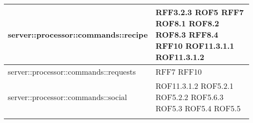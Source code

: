 \begin{center}
\begin{longtable}{| p{9cm} | p{4cm} |}
\hline
server::processor::commands::recipe  &  RFF3.2.3 \newline ROF5 \newline RFF7 \newline ROF8.1 \newline ROF8.2 \newline ROF8.3 \newline RFF8.4 \newline RFF10 \newline ROF11.3.1.1 \newline ROF11.3.1.2 \\
\hline
server::processor::commands::requests  & RFF7 \newline RFF10 \\
\hline
server::processor::commands::social  &  ROF11.3.1.2 \newline ROF5.2.1 \newline ROF5.2.2 \newline ROF5.6.3 \newline ROF5.3 \newline ROF5.4 \newline ROF5.5 \\
\hline \\
\end{longtable}
\egroup
\end{center}

